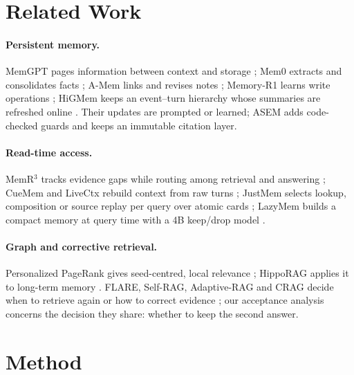 \documentclass[10pt]{article}
\theoremstyle{plain}
\theoremstyle{definition}
\newcommand{\asem}{\textsc{ASEM}}
\begin{document}
\section{Related Work}
\label{sec:related}

\paragraph{Persistent memory.} MemGPT pages information between context and storage
\citep{packer2023memgpt}; Mem0 extracts and consolidates facts \citep{chhikara2025mem0}; A-Mem links
and revises notes \citep{amem2025}; Memory-R1 learns write operations \citep{memoryr12025}; HiGMem keeps
an event--turn hierarchy whose summaries are refreshed online \citep{cao2026higmem}. Their updates are
prompted or learned; \asem{} adds code-checked guards and keeps an immutable citation layer.

\paragraph{Read-time access.} MemR$^3$ tracks evidence gaps while routing among retrieval and answering
\citep{du2026memr3}; CueMem and LiveCtx rebuild context from raw turns \citep{wang2026cuemem,liu2026livectx};
JustMem selects lookup, composition or source replay per query over atomic cards
\citep{chen2026justmem}; LazyMem builds a compact memory at query time with a 4B keep/drop model
\citep{yu2026lazymem}.

\paragraph{Graph and corrective retrieval.} Personalized PageRank gives seed-centred, local relevance
\citep{andersen2006local}; HippoRAG applies it to long-term memory \citep{gutierrez2024hipporag}.
FLARE, Self-RAG, Adaptive-RAG and CRAG decide when to retrieve again or how to correct evidence
\citep{jiang2023active,asai2023selfrag,jeong2024adaptive,yan2024crag}; our acceptance analysis concerns
the decision they share: whether to keep the second answer.

\section{Method}
\label{sec:method}
\end{document}
